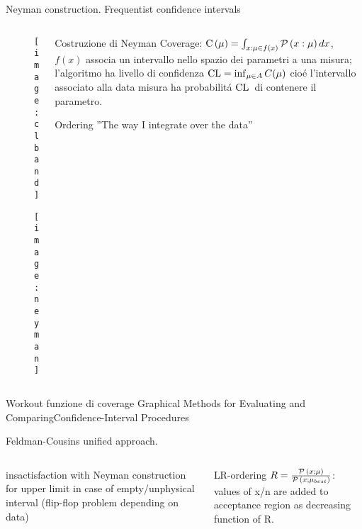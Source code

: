 \begin{frame}{Neyman construction. Frequentist confidence intervals}
\begin{columns}[T]
\begin{column}{0.4\textwidth}
	\begin{figure}
		\centering
		\texttt{[image: clband]}
		\label{fig:clband}
	\end{figure}
	\begin{figure}
		\centering
		\texttt{[image: neyman]}
		\label{fig:neyman}
	\end{figure}
\end{column}
\begin{column}{0.6\textwidth}
	\begin{block}{Costruzione di Neyman}
		Coverage: $\operatorname{C}{(\mu)}=\int_{x:\mu\in f(x)}\operatorname{\mathcal{P}}{(x:\mu)}\,dx$, $f(x)$ associa un intervallo nello spazio dei parametri a una misura; l'algoritmo ha livello di confidenza $\operatorname{CL}=\inf_{\mu\in A}C(\mu)$ cio\'e l'intervallo associato alla data misura ha probabilit\'a $\operatorname{CL}{}$ di contenere il parametro.
	\end{block}
	\begin{block}{Ordering}
		''The way I integrate over the data''
	\end{block}
\end{column}
\end{columns}
\end{frame}

\begin{wordonframe}{Workout funzione di coverage}
Graphical Methods for Evaluating and ComparingConfidence-Interval Procedures
\end{wordonframe}

\begin{frame}{Feldman-Cousins unified approach.}
\begin{columns}[T]
\begin{column}{0.5\textwidth}
insactisfaction with Neyman construction for upper limit in case of empty/unphysical interval (flip-flop problem depending on data)
\end{column}
\begin{column}{0.5\textwidth}
LR-ordering $R=\frac{\operatorname{\mathcal{P}}{(x;\mu)}}{\operatorname{\mathcal{P}}{(x;\mu_{best})}}$: values of x/n are added to acceptance region as decreasing function of R.
\end{column}
\end{columns}
\end{frame}

